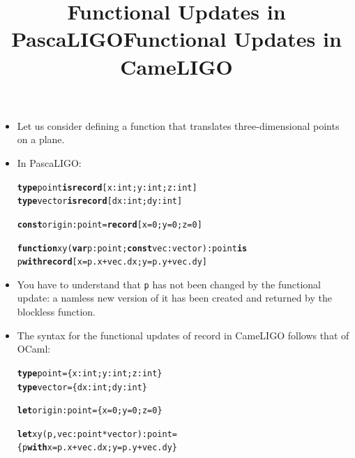 \documentclass[wide]{slides}
\newcommand{\Kconst}[0]{\textbf{const}\xspace}
\newcommand{\Kfunction}[0]{\textbf{function}\xspace}
\newcommand{\Kis}[0]{\textbf{is}\xspace}
\newcommand{\Krecord}[0]{\textbf{record}\xspace}
\newcommand{\Ktype}[0]{\textbf{type}\xspace}
\newcommand{\Kvar}[0]{\textbf{var}\xspace}
\newcommand{\Kwith}[0]{\textbf{with}\xspace}
\newcommand{\Klet}[0]{\textbf{let}\xspace}
\begin{document}
\begin{slide}
  \title{Functional Updates in PascaLIGO}

  \begin{itemize}

    \item Let us consider defining a function that translates
      three-dimensional points on a plane.

    \item In PascaLIGO:
      \begin{alltt}
\Ktype point \Kis \Krecord [x : int; y : int; z : int]
\Ktype vector \Kis \Krecord [dx : int; dy : int]

\Kconst origin : point = \Krecord [x = 0; y = 0; z = 0]

\Kfunction xy (\Kvar p : point; \Kconst vec : vector) : point \Kis
  p \Kwith \Krecord [x = p.x + vec.dx; y = p.y + vec.dy]
      \end{alltt}

    \item You have to understand that \texttt{p} has not been changed
      by the functional update: a namless new version of it has been
      created and returned by the blockless function.

  \end{itemize}

\end{slide}


\begin{slide}
  \title{Functional Updates in CameLIGO}

  \begin{itemize}

    \item The syntax for the functional updates of record in CameLIGO
      follows that of OCaml:
      \begin{alltt}
\Ktype point = \{x : int; y : int; z : int\}
\Ktype vector = \{dx : int; dy : int\}

\Klet origin : point = \{x = 0; y = 0; z = 0\}

\Klet xy (p, vec : point * vector) : point =
  \{p \Kwith x = p.x + vec.dx; y = p.y + vec.dy\}
      \end{alltt}

  \end{itemize}

\end{slide}
\end{document}
